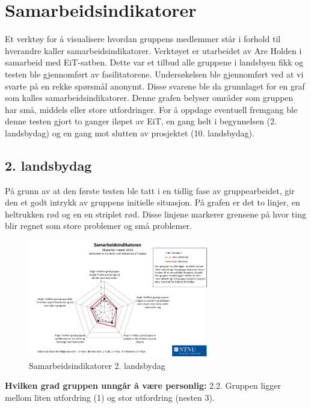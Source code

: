\section{Samarbeidsindikatorer}
Et verktøy for å visualisere hvordan gruppens medlemmer står i forhold til hverandre kaller samarbeidsindikatorer. 
Verktøyet er utarbeidet av Are Holden i samarbeid med EiT-satben. 
Dette var et tilbud alle gruppene i landsbyen fikk og testen ble gjennomført av fasilitatorene. 
Undersøkelsen ble gjennomført ved at vi svarte på en rekke spørsmål anonymt. 
Disse svarene ble da grunnlaget for en graf som kalles samarbeidsindikatorer. 
Denne grafen belyser områder som gruppen har små, middels eller store utfordringer. 
For å oppdage eventuell fremgang ble denne testen gjort to ganger iløpet av EiT, en gang helt i begynnelsen (2. landsbydag) og en gang mot slutten av prosjektet (10. landsbydag). 

\subsection{2. landsbydag}
På grunn av at den første testen ble tatt i en tidlig fase av gruppearbeidet, gir den et godt intrykk av gruppens initielle situasjon. 
På grafen er det to linjer, en heltrukken rød og en en striplet rød. 
Disse linjene markerer grensene på hvor ting blir regnet som store problemer og små problemer. 
\begin{figure}[H]
    \centering
    \includegraphics[width=0.7\textwidth]{images/samarbeidsindikator1.jpeg}	
    \caption{Samarbeidsindikatorer 2. landsbydag}
    \label{fig:sam1}
\end{figure}

\noindent \textbf{Hvilken grad gruppen unngår å være personlig:} 2.2.
\newline
\noindent Gruppen ligger mellom liten utfordring (1) og stor utfordring (nesten 3).
\vspace{\secspace}

